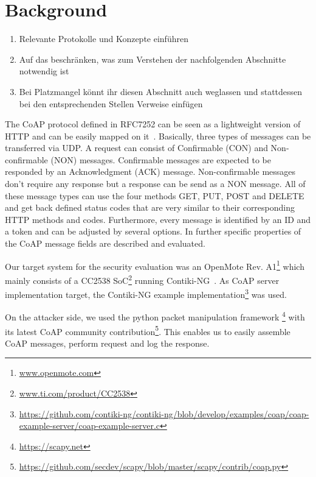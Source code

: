 \section{Background}
\label{section:background}

\begin{enumerate}
	\item Relevante Protokolle und Konzepte einführen
	\item Auf das beschränken, was zum Verstehen der nachfolgenden Abschnitte notwendig ist
	\item Bei Platzmangel könnt ihr diesen Abschnitt auch weglassen und stattdessen bei den entsprechenden Stellen Verweise einfügen
\end{enumerate}

The CoAP protocol defined in RFC7252 can be seen as a lightweight version of HTTP and can be easily mapped on it~\cite{RFC7252}. Basically, three types of messages can be transferred via UDP. A request can consist of Confirmable (CON) and Non-confirmable (NON) messages. Confirmable messages are expected to be responded by an Acknowledgment (ACK) message. Non-confirmable messages don't require any response but a response can be send as a NON message. All of these message types can use the four methods GET, PUT, POST and DELETE and get back defined status codes that are very similar to their corresponding HTTP methods and codes. Furthermore, every message is identified by an ID and a token and can be adjusted by several options. In  further specific properties of the CoAP message fields are described and evaluated.

Our target system for the security evaluation was an OpenMote Rev. A1\footnote{\url{www.openmote.com}} which mainly consists of a CC2538 SoC\footnote{\url{www.ti.com/product/CC2538}} running Contiki-NG~\cite{contiki}. As CoAP server implementation target, the Contiki-NG example implementation\footnote{\url{https://github.com/contiki-ng/contiki-ng/blob/develop/examples/coap/coap-example-server/coap-example-server.c}} was used.

On the attacker side, we used the python packet manipulation framework \scapy\footnote{\url{https://scapy.net}} with its latest CoAP community contribution\footnote{\url{https://github.com/secdev/scapy/blob/master/scapy/contrib/coap.py}}. This enables us to easily assemble CoAP messages, perform request and log the response.

